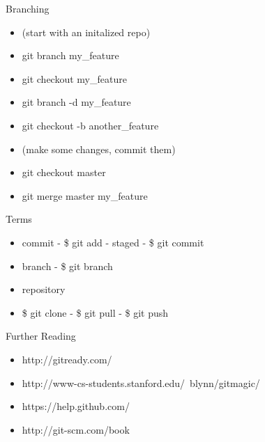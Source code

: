 \documentclass{beamer}
\begin{document}
\begin{frame}{Branching}
  \begin{center}
    \begin{itemize}
      \item (start with an initalized repo)
      \item git branch my\_feature
      \item git checkout my\_feature
      \item git branch -d my\_feature
      \item git checkout -b another\_feature
      \item (make some changes, commit them)
      \item git checkout master
      \item git merge master my\_feature
    \end{itemize}
  \end{center}
\end{frame}

\begin{frame}{Terms}
  \begin{center}
    \begin{itemize}
      \item commit - \$ git add - staged - \$ git commit
      \item branch - \$ git branch
      \item repository
      \item \$ git clone - \$ git pull - \$ git push
    \end{itemize}
  \end{center}
\end{frame}

\begin{frame}{Further Reading}
  \begin{center}
    \begin{itemize}
      \item http://gitready.com/
      \item http://www-cs-students.stanford.edu/~blynn/gitmagic/
      \item https://help.github.com/
      \item http://git-scm.com/book
    \end{itemize}
  \end{center}
\end{frame}
\end{document}
